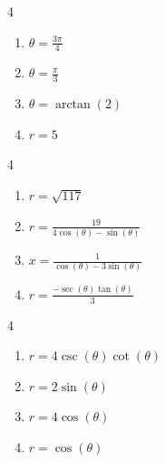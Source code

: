 \documentclass{ximera}
\begin{document}
\begin{multicols}{4}

\begin{enumerate}

\setcounter{enumi}{\value{HW}}

\item $\theta = \frac{3\pi}{4}$  
\item $\theta = \frac{\pi}{3}$  
\item $\theta = \arctan(2)$
\item $r = 5$

\setcounter{HW}{\value{enumi}}

\end{enumerate}

\end{multicols}

\begin{multicols}{4}

\begin{enumerate}

\setcounter{enumi}{\value{HW}}

\item $r = \sqrt{117}$
\item $r = \frac{19}{4\cos(\theta) - \sin(\theta)}$
\item $x = \frac{1}{\cos(\theta) - 3\sin(\theta)}$
\item \small $r = \frac{-\sec(\theta)\tan(\theta)}{3}$ \normalsize

\setcounter{HW}{\value{enumi}}

\end{enumerate}

\end{multicols}

\begin{multicols}{4}

\begin{enumerate}

\setcounter{enumi}{\value{HW}}

\item \small $r = 4\csc(\theta)\cot(\theta)$ \normalsize
\item $r=2\sin(\theta)$
\item $r = 4\cos(\theta)$
\item $r = \cos(\theta)$

\setcounter{HW}{\value{enumi}}

\end{enumerate}

\end{multicols}
\end{document}
